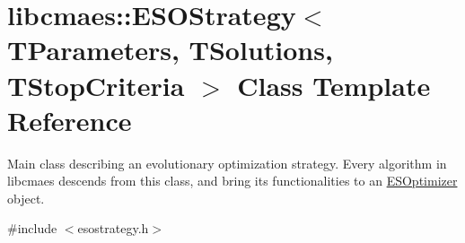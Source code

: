 \hypertarget{classlibcmaes_1_1ESOStrategy}{\section{libcmaes\-:\-:E\-S\-O\-Strategy$<$ T\-Parameters, T\-Solutions, T\-Stop\-Criteria $>$ Class Template Reference}
\label{classlibcmaes_1_1ESOStrategy}
}


Main class describing an evolutionary optimization strategy. Every algorithm in libcmaes descends from this class, and bring its functionalities to an \hyperlink{classlibcmaes_1_1ESOptimizer}{E\-S\-Optimizer} object.  




{\ttfamily \#include $<$esostrategy.\-h$>$}

